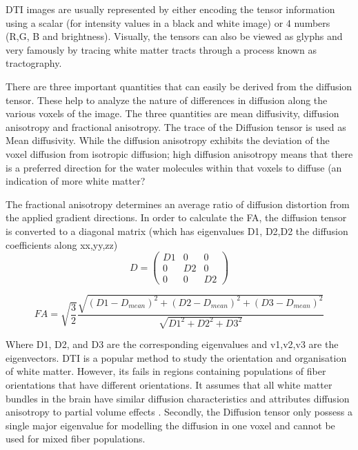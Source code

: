 \documentclass[msthesis.tex]{subfiles}
\begin{document}
DTI images are usually represented by either encoding the tensor information using a scalar (for intensity values in a black and white image) or 4 numbers (R,G, B and brightness). Visually, the tensors can also be viewed as glyphs and very famously by tracing white matter tracts through a process known as tractography.


There are three important quantities that can easily be derived from the diffusion tensor. These help to analyze the nature of differences in diffusion along the various voxels of the image. The three quantities are mean diffusivity, diffusion anisotropy and fractional anisotropy. The trace of the Diffusion tensor is used as Mean diffusivity. While the diffusion anisotropy exhibits the deviation of the voxel diffusion from isotropic diffusion; high diffusion anisotropy means that there is a preferred direction for the water molecules within that voxels to diffuse (an indication of more white matter?

The fractional anisotropy determines an average ratio of diffusion distortion from the applied gradient directions. In order to calculate the FA, the diffusion tensor is converted to a diagonal matrix (which has eigenvalues D1, D2,D2 the diffusion coefficients along xx,yy,zz) \\
\begin{equation*}
D =
 \begin{pmatrix}
D1 & 0 & 0 \\
0 & D2 & 0 \\
0 & 0 & D2
\end{pmatrix}   
\end{equation*}


\begin{equation}
\label{eq:meanFA}
FA = \sqrt{\frac{3}{2}} \frac{\sqrt{(D1 -D_{mean})^2+(D2 -D_{mean})^2 + (D3 -D_{mean})^2
}}{\sqrt{D1^2 + D2^2 + D3^2}}
\end{equation}

Where D1, D2, and D3 are the corresponding eigenvalues and v1,v2,v3 are the eigenvectors.
DTI is a popular method to study the orientation and organisation of white matter. However, its fails in regions containing populations of fiber orientations that have different orientations. It assumes that all white matter bundles in the brain have similar diffusion characteristics and attributes diffusion anisotropy to partial volume effects \cite{tournier2004direct}. Secondly, the Diffusion tensor only possess a single major eigenvalue for modelling the diffusion in one voxel and cannot be used for mixed fiber populations.
\end{document}
